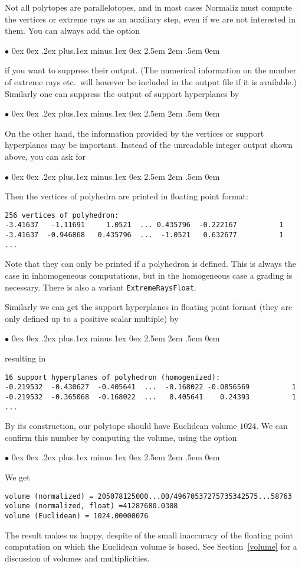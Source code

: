 \documentclass[12pt,a4paper]{scrartcl}
\newcommand{\stdli}{ \topsep0ex \partopsep0ex %
\parsep.2ex plus.1ex minus.1ex \itemsep0ex%
\leftmargin2.5em \labelwidth2em \labelsep.5em \rightmargin0em}%
\renewenvironment{itemize}{\begin{list}{{$\bullet$}}{\stdli}}{\end{list}}
\theoremstyle{definition}
\def\itemtt[#1]{\item[\textbf{\ttt{#1}}]}
\def\ttt{\texttt}
\begin{document}
Not all polytopes are parallelotopes, and in most cases Normaliz must compute the vertices or extreme rays as an auxiliary step, even if we are not interested in them. You can always add the option
\begin{itemize}
	\itemtt [NoExtRaysOutput]
\end{itemize}
if you want to suppress their output. (The numerical information on the number of extreme rays etc.\ will however be included in the output file if it is available.) Similarly one can suppress the output of support hyperplanes by
\begin{itemize}
	\itemtt [NoSuppHypsOutput]
\end{itemize}

On the other hand, the information provided by the vertices or support hyperplanes may be important. Instead of the unreadable integer output shown above, you can ask for
\begin{itemize}
	\itemtt [VerticesFloat]
\end{itemize}
Then the vertices of polyhedra are printed in floating point format:
\begin{Verbatim}
256 vertices of polyhedron:
-3.41637   -1.11691     1.0521  ... 0.435796  -0.222167          1 
-3.41637  -0.946868   0.435796  ...  -1.0521   0.632677          1
...
\end{Verbatim}
Note that they can only be printed if a polyhedron is defined. This is always the case in inhomogeneous computations, but in the homogeneous case a grading is necessary. There is also a variant \verb|ExtremeRaysFloat|.

Similarly we can get the support hyperplanes in floating point format (they are only defined up to a positive scalar multiple) by
\begin{itemize}
	\itemtt [SuppHypsFloat]
\end{itemize}
resulting in
\begin{Verbatim}
16 support hyperplanes of polyhedron (homogenized):
-0.219532  -0.430627  -0.405641  ...  -0.168022 -0.0856569          1 
-0.219532  -0.365068  -0.168022  ...   0.405641    0.24393          1 
...  
\end{Verbatim}

By its construction, our polytope should have Euclidean volume $1024$. We can confirm this number by computing the volume, using the option
\begin{itemize}
	\itemtt [Volume, -V]
\end{itemize}
We get
\begin{Verbatim}
volume (normalized) = 205078125000...00/49670537275735342575...58763
volume (normalized, float) =41287680.0308
volume (Euclidean) = 1024.00000076
\end{Verbatim}
The result makes us happy, despite of the small inaccuracy of the floating point computation on which the Euclidean volume is based. See Section~\ref{volume} for a discussion of volumes and multiplicities.
\end{document}
